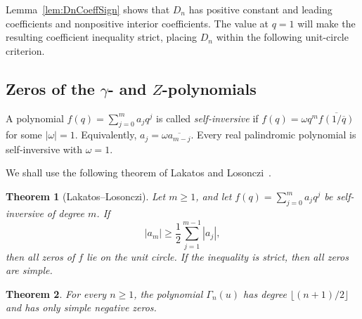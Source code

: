 \documentclass[11pt]{article}
\theoremstyle{plain}
\newtheorem{theorem}{Theorem}[section]
\theoremstyle{remark}
\begin{document}
Lemma~\ref{lem:DnCoeffSign} shows that $D_n$ has positive constant and
leading coefficients and nonpositive interior coefficients.  The
value at
$q=1$ will make the resulting coefficient inequality strict, placing
$D_n$ within the following unit-circle criterion.

\subsection{Zeros of the \texorpdfstring{$\gamma$}{gamma}- and \texorpdfstring{$Z$}{Z}-polynomials}

A polynomial $f(q)=\sum_{j=0}^m a_jq^j$ is called
\emph{self-inversive} if
$f(q)=\omega q^m\overline{f(1/\overline q)}$ for some
$|\omega|=1$.  Equivalently,
$a_j=\omega\overline{a_{m-j}}$.  Every real palindromic polynomial is
self-inversive with $\omega=1$.

We shall use the following theorem of Lakatos and
Losonczi~\cite[Theorem~1(ii)-1 and (ii)-2]{LakatosLosonczi}.

\begin{theorem}[Lakatos--Losonczi]\label{thm:LL}
Let $m\ge1$, and let
$f(q)=\sum_{j=0}^m a_jq^j$ be self-inversive of degree $m$.  If
\[
|a_m|\ge\frac12\sum_{j=1}^{m-1}|a_j|,
\]
then all zeros of $f$ lie on the unit circle.  If the inequality is
strict, then all zeros are simple.
\end{theorem}

\begin{theorem}\label{thm:GammaRealRooted}
For every $n\ge1$, the polynomial $\Gamma_n(u)$ has degree
$\lfloor(n+1)/2\rfloor$ and has only simple negative zeros.
\end{theorem}
\end{document}
